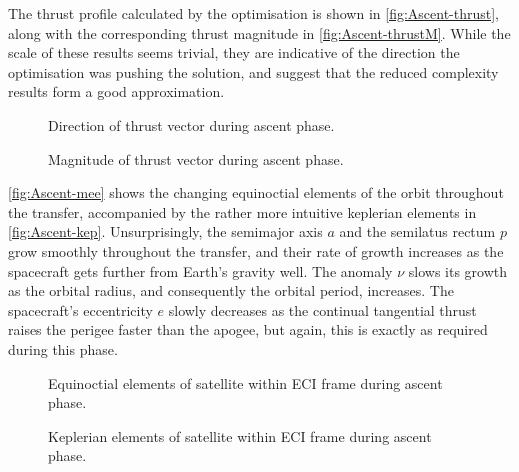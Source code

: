The thrust profile calculated by the optimisation is shown in \autoref{fig:Ascent-thrust}, along with the corresponding thrust magnitude in \autoref{fig:Ascent-thrustM}. While the scale of these results seems trivial, they are indicative of the direction the optimisation was pushing the solution, and suggest that the reduced complexity results form a good approximation. 

\begin{figure}
\centering
\def\svgwidth{\figurewidth}

\caption{Direction of thrust vector during ascent phase.}
\label{fig:Ascent-thrust}
\end{figure}

\begin{figure}
\centering
\def\svgwidth{\figurewidth}

\caption{Magnitude of thrust vector during ascent phase.}
\label{fig:Ascent-thrustM}
\end{figure}

\autoref{fig:Ascent-mee} shows the changing equinoctial elements of the orbit throughout the transfer, accompanied by the rather more intuitive keplerian elements in \autoref{fig:Ascent-kep}. Unsurprisingly, the semimajor axis $a$ and the semilatus rectum $p$ grow smoothly throughout the transfer, and their rate of growth increases as the spacecraft gets further from Earth's gravity well. The anomaly $\nu$ slows its growth as the orbital radius, and consequently the orbital period, increases. The spacecraft's eccentricity $e$ slowly decreases as the continual tangential thrust raises the perigee faster than the apogee, but again, this is exactly as required during this phase.

\begin{figure}
\centering
\def\svgwidth{\figurewidth}

\caption{Equinoctial elements of satellite within ECI frame during ascent phase.}
\label{fig:Ascent-mee}
\end{figure}

\begin{figure}
\centering
\def\svgwidth{\figurewidth}

\caption{Keplerian elements of satellite within ECI frame during ascent phase.}
\label{fig:Ascent-kep}
\end{figure}

